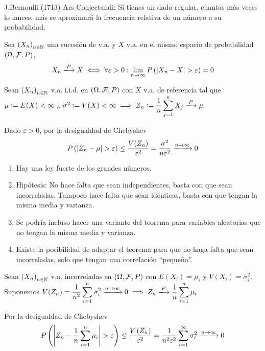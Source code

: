 J.Bernoulli (1713) Ars Conjectandi: Si tienes un dado regular, cuantas más veces lo lances, más se aproximará la frecuencia relativa de un número a su probabilidad.

\begin{defn}
	Sea $\left(X_n\right)_{n\in \mathbb{N}}$ una sucesión de v.a. y $X$ v.a. en el mismo espacio de probabilidad $(\Omega, \mathcal{F}, P)$,
	\[ X_n \xlongrightarrow{P} X \iff \forall \varepsilon > 0 : \lim_{n\to\infty} P\left(\abs{X_n - X} > \varepsilon\right) = 0\]
\end{defn} %

\begin{teo}
	Sean $\left(X_n\right)_{n\in \mathbb{N}}$ v.a. i.i.d. en $(\Omega, \mathcal{F}, P)$ con $X$ v.a. de referencia tal que $\mu \defeq E(X) < \infty \we \sigma^2 \defeq V(X) < \infty \ds \implies Z_n \defeq \frac{1}{n} \sum_{j=1}^{n} X_j \xlongrightarrow{P} \mu$
	\begin{dem}
		Dado $\varepsilon > 0$, por la desigualdad de Chebyshev
		\[P\left(\left|Z_n - \mu\right| > \varepsilon \right) \leq \frac{V(Z_n)}{\varepsilon^2} = \frac{\sigma^2}{n\varepsilon^2} \xrightarrow{n\to\infty} 0\]
	\end{dem}
\end{teo}

\begin{obs}
	\begin{enumerate}
		\item Hay una ley fuerte de los grandes números.
		\item Hipótesis: No hace falta que sean independientes, basta con que sean incorreladas. Tampoco hace falta que sean idénticas, basta con que tengan la misma media y varianza.
		\item Se podría incluso hacer una variante del teorema para variables aleatorias que no tengan la misma media y varianza.
		\item Existe la posibilidad de adaptar el teorema para que no haga falta que sean incorreladas, solo que tengan una correlación ``pequeña''.
	\end{enumerate}
\end{obs}

\begin{teo}
	Sean $\left(X_n\right)_{n\in \mathbb{N}}$ v.a. incorreladas en $(\Omega, \mathcal{F}, P)$ con $E(X_i) = \mu_i$ y $V(X_i) = \sigma_i^2$. Suponemos $\ds V(Z_n) = \frac{1}{n^2}\sum_{i=1}^{n} \sigma_i^2 \xrightarrow{n\to\infty} 0 \implies Z_n \xlongrightarrow{P} \frac{1}{n} \sum_{i=1}^{n} \mu_i$
	\begin{dem} Por la desigualdad de Chebyshev
		\[P\left(\left|Z_n - \frac{1}{n} \sum_{i=1}^{n} \mu_i\right| > \varepsilon \right) \leq \frac{V\left(Z_n\right)}{\varepsilon^2} = \frac{1}{n^2\varepsilon^2}\sum_{i=1}^{\infty} \sigma_i^2 \xrightarrow{n\to\infty} 0\]
	\end{dem}
\end{teo}


